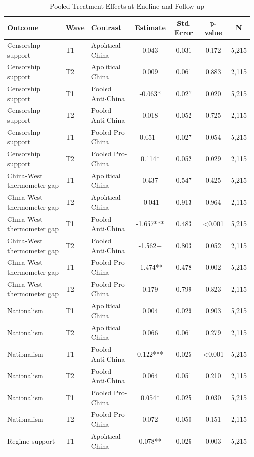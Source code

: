 \begin{table}[H]
\centering
\caption{Pooled Treatment Effects at Endline and Follow-up}
\label{tab:persistence_pooled_t1_t2}
\footnotesize
\begin{threeparttable}
\begin{tabular}{lllcccc}
\toprule
Outcome & Wave & Contrast & Estimate & Std. Error & p-value & N \\
\midrule
Censorship support & T1 & Apolitical China & 0.043 & 0.031 & 0.172 & 5,215 \\
Censorship support & T2 & Apolitical China & 0.009 & 0.061 & 0.883 & 2,115 \\
Censorship support & T1 & Pooled Anti-China & -0.063* & 0.027 & 0.020 & 5,215 \\
Censorship support & T2 & Pooled Anti-China & 0.018 & 0.052 & 0.725 & 2,115 \\
Censorship support & T1 & Pooled Pro-China & 0.051+ & 0.027 & 0.054 & 5,215 \\
Censorship support & T2 & Pooled Pro-China & 0.114* & 0.052 & 0.029 & 2,115 \\
China-West thermometer gap & T1 & Apolitical China & 0.437 & 0.547 & 0.425 & 5,215 \\
China-West thermometer gap & T2 & Apolitical China & -0.041 & 0.913 & 0.964 & 2,115 \\
China-West thermometer gap & T1 & Pooled Anti-China & -1.657*** & 0.483 & <0.001 & 5,215 \\
China-West thermometer gap & T2 & Pooled Anti-China & -1.562+ & 0.803 & 0.052 & 2,115 \\
China-West thermometer gap & T1 & Pooled Pro-China & -1.474** & 0.478 & 0.002 & 5,215 \\
China-West thermometer gap & T2 & Pooled Pro-China & 0.179 & 0.799 & 0.823 & 2,115 \\
Nationalism & T1 & Apolitical China & 0.004 & 0.029 & 0.903 & 5,215 \\
Nationalism & T2 & Apolitical China & 0.066 & 0.061 & 0.279 & 2,115 \\
Nationalism & T1 & Pooled Anti-China & 0.122*** & 0.025 & <0.001 & 5,215 \\
Nationalism & T2 & Pooled Anti-China & 0.064 & 0.051 & 0.210 & 2,115 \\
Nationalism & T1 & Pooled Pro-China & 0.054* & 0.025 & 0.030 & 5,215 \\
Nationalism & T2 & Pooled Pro-China & 0.072 & 0.050 & 0.151 & 2,115 \\
Regime support & T1 & Apolitical China & 0.078** & 0.026 & 0.003 & 5,215 \\

\end{tabular}
\end{threeparttable}
\end{table}
